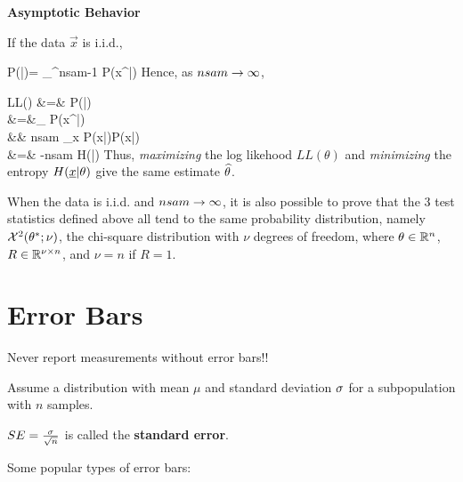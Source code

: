 {\bf Asymptotic Behavior}

If the data
$\vec{x}$ is i.i.d.,

\beq
P(|\theta)=
\prod_{}^{nsam-1} P(x^\s|\theta)
\;
\eeq
Hence, as $nsam\rightarrow \infty$,

\beqa
LL(\theta)
&=&
\ln P(|\theta)
\\
&=&\sum_\s \ln
P(x^\s|\theta)
\\
&\rarrow&
nsam \sum_x P(x|\theta)\ln  P(x|\theta)
\\
&=&
-nsam \; H(\rvx|\theta)
\eeqa
Thus, {\it maximizing} the log likehood
$LL(\theta)$
and {\it minimizing} the entropy
$H(\rvx|\theta)$
give the same estimate ${\widehat{\theta}}$.

When the
data is i.i.d. and
$nsam\rightarrow \infty$,
it is also possible to
prove that
the 3 test statistics
defined above all tend to
the same
probability  distribution, namely
${\cal X}^2(\theta^*; \nu)$,
the chi-square distribution
with $\nu$ degrees of freedom,
where $\theta\in { \mathbb{R}}^n$, $R\in { \mathbb{R}}^
{\nu\times n}$, and $\nu=n$ if $R=1$.

\section{Error Bars}
Never report measurements without error bars!!

Assume a distribution
with mean $\mu$ and
standard deviation $\sigma$
for a subpopulation with $n$
samples.

$SE=\frac{\sigma}{\sqrt{n}}$
is called the {\bf standard error}.


Some popular types of error bars:



